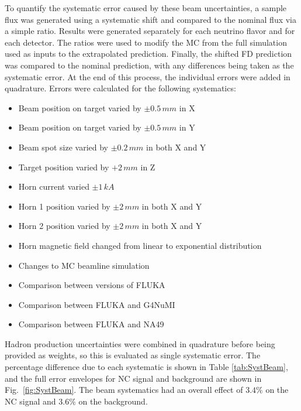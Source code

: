 To quantify the systematic error caused by these beam uncertainties, a sample flux was generated using a systematic shift and compared to the nominal flux via a simple ratio. Results were generated separately for each neutrino flavor and for each detector. The ratios were used to modify the MC from the full simulation used as inputs to the extrapolated prediction. Finally, the shifted FD prediction was compared to the nominal prediction, with any differences being taken as the systematic error. At the end of this process, the individual errors were added in quadrature. Errors were calculated for the following systematics:
\begin{singlespace}
\begin{itemize}
  \item Beam position on target varied by $\pm 0.5\,mm$ in X
  \item Beam position on target varied by $\pm 0.5\,mm$ in Y
  \item Beam spot size varied by $\pm 0.2\,mm$ in both X and Y
  \item Target position varied by $+ 2\, mm$ in Z
  \item Horn current varied $\pm 1\,kA$
  \item Horn 1 position varied by $\pm 2\,mm$ in both X and Y
  \item Horn 2 position varied by $\pm 2\,mm$ in both X and Y
  \item Horn magnetic field changed from linear to exponential distribution
  \item Changes to MC beamline simulation
  \item Comparison between versions of FLUKA
  \item Comparison between FLUKA and G4NuMI
  \item Comparison between FLUKA and NA49
\end{itemize}
\end{singlespace}
\n Hadron production uncertainties were combined in quadrature before being provided as weights, so this is evaluated as single systematic error. The percentage difference due to each systematic is shown in Table \ref{tab:SystBeam}, and the full error envelopes for NC signal and background are shown in Fig.~\ref{fig:SystBeam}. The beam systematics had an overall effect of $3.4\%$ on the NC signal and $3.6\%$ on the background.
